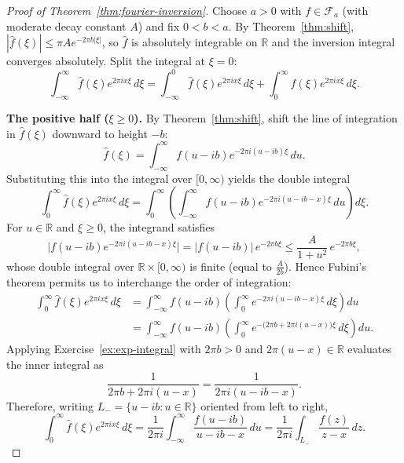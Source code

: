 \documentclass[11pt]{article}
\theoremstyle{plain}
\theoremstyle{definition}
\theoremstyle{boldremark}
\theoremstyle{remark}
\numberwithin{equation}{section}
\newcommand{\R}{\mathbb{R}}
\begin{document}
\begin{proof}[Proof of Theorem~\ref{thm:fourier-inversion}]
Choose $a>0$ with $f\in\mathcal F_a$ (with moderate decay constant $A$) and
fix $0<b<a$. By Theorem~\ref{thm:shift}, $|\widehat f(\xi)|\leq\pi A e^{-2\pi b|\xi|}$,
so $\widehat f$ is absolutely integrable on $\R$ and the inversion integral
converges absolutely. Split the integral at $\xi=0$:
\[
 \int_{-\infty}^{\infty}\widehat f(\xi)e^{2\pi ix\xi}\,d\xi
 = \int_{-\infty}^{0}\widehat f(\xi)e^{2\pi ix\xi}\,d\xi
 + \int_{0}^{\infty}\widehat f(\xi)e^{2\pi ix\xi}\,d\xi.
\]

\textbf{The positive half ($\xi\geq 0$).} By Theorem~\ref{thm:shift}, shift
the line of integration in $\widehat f(\xi)$ downward to height $-b$:
\[
 \widehat f(\xi) = \int_{-\infty}^{\infty} f(u-ib)e^{-2\pi i(u-ib)\xi}\,du.
\]
Substituting this into the integral over $[0,\infty)$ yields the double
integral
\[
 \int_0^\infty \widehat f(\xi)e^{2\pi ix\xi}\,d\xi
 = \int_0^\infty\left(\int_{-\infty}^{\infty}
    f(u-ib)e^{-2\pi i(u-ib-x)\xi}\,du\right)d\xi.
\]
For $u\in\R$ and $\xi\geq 0$, the integrand satisfies
\[
 \bigl|f(u-ib)e^{-2\pi i(u-ib-x)\xi}\bigr|
 = |f(u-ib)|\,e^{-2\pi b\xi}
 \leq \frac{A}{1+u^2}\,e^{-2\pi b\xi},
\]
whose double integral over $\R\times[0,\infty)$ is finite (equal to
$\frac{A}{2b}$). Hence Fubini's theorem permits us to interchange the order
of integration:
\begin{align*}
 \int_0^\infty\widehat f(\xi)e^{2\pi ix\xi}\,d\xi
 &= \int_{-\infty}^{\infty} f(u-ib)
    \left(\int_0^\infty e^{-2\pi i(u-ib-x)\xi}\,d\xi\right)du \\
 &= \int_{-\infty}^{\infty} f(u-ib)
    \left(\int_0^\infty e^{-\bigl(2\pi b+2\pi i(u-x)\bigr)\xi}\,d\xi\right)du.
\end{align*}
Applying Exercise~\ref{ex:exp-integral} with $2\pi b>0$ and $2\pi(u-x)\in\R$
evaluates the inner integral as
\[
 \frac{1}{2\pi b+2\pi i(u-x)} = \frac{1}{2\pi i(u-ib-x)}.
\]
Therefore, writing $L_-=\{u-ib:u\in\R\}$ oriented from left to right,
\begin{equation}\label{eq:inv-pos}
 \int_0^\infty\widehat f(\xi)e^{2\pi ix\xi}\,d\xi
 = \frac{1}{2\pi i}\int_{-\infty}^{\infty}\frac{f(u-ib)}{u-ib-x}\,du
 = \frac{1}{2\pi i}\int_{L_-}\frac{f(z)}{z-x}\,dz.
\end{equation}


\end{proof}
\end{document}
